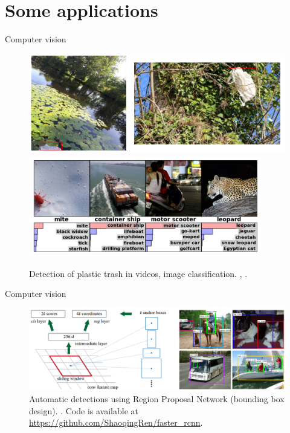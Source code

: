 \documentclass[xcolor={usenames,dvipsnames},handout]{beamer}
\begin{document}
\section{Some applications}







\begin{frame}{Computer vision}
\begin{figure}
\includegraphics[width=0.7\linewidth]{plastic}
\includegraphics[width=0.7\linewidth]{image_classif}
\caption{Detection of plastic trash in videos, image classification.  {\tiny \href{https://proceedings.neurips.cc/paper/2012/file/c399862d3b9d6b76c8436e924a68c45b-Paper.pdf}{}},   {\tiny \href{PlasticTrash}{}}.}
\end{figure}
\end{frame}

\begin{frame}{Computer vision}
\begin{figure}
\includegraphics[width=0.9\linewidth]{image_bbox}
\caption{Automatic detections using Region Proposal Network (bounding box design). {\tiny \href{https://papers.nips.cc/paper/2015/hash/14bfa6bb14875e45bba028a21ed38046-Abstract.html}{}}. Code is available at \url{https://github.com/ShaoqingRen/faster_rcnn}.}
\end{figure}
\end{frame}
\end{document}
